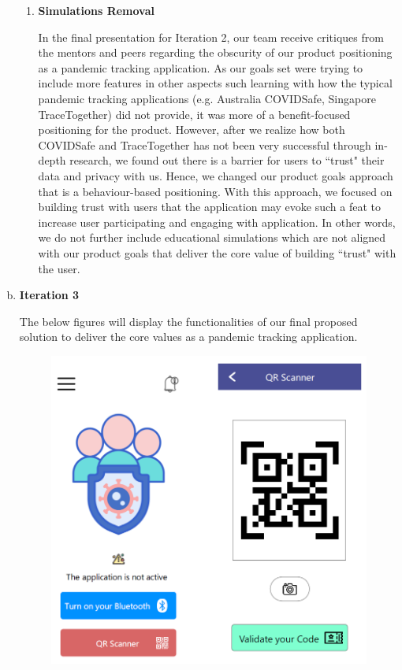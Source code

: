 \begin{enumerate}[a)]
\begin{enumerate}[label=(\roman*)]
          \item \textbf{Simulations Removal}
            \par In the final presentation for Iteration 2, our team receive critiques from the mentors and peers regarding the obscurity of our product positioning as a pandemic tracking application. As our goals set were trying to include more features in other aspects such learning with how the typical pandemic tracking applications (e.g. Australia COVIDSafe, Singapore TraceTogether) did not provide, it was more of a benefit-focused positioning for the product. However, after we realize how both COVIDSafe and TraceTogether has not been very successful through in-depth research, we found out there is a barrier for users to ``trust" their data and privacy with us. Hence, we changed our product goals approach that is a behaviour-based positioning. With this approach, we focused on building trust with users that the application may evoke such a feat to increase user participating and engaging with application. In other words, we do not further include educational simulations which are not aligned with our product goals that deliver the core value of building ``trust" with the user.
        \end{enumerate}
        \item \textbf{Iteration 3}
          \par The below figures will display the functionalities of our final proposed solution to deliver the core
          values as a pandemic tracking application.
          \begin{figure}[H]
            \centering
            \includegraphics[scale=1]{img/prototype/iter3-proto-1.png}

\end{figure}
\end{enumerate}
